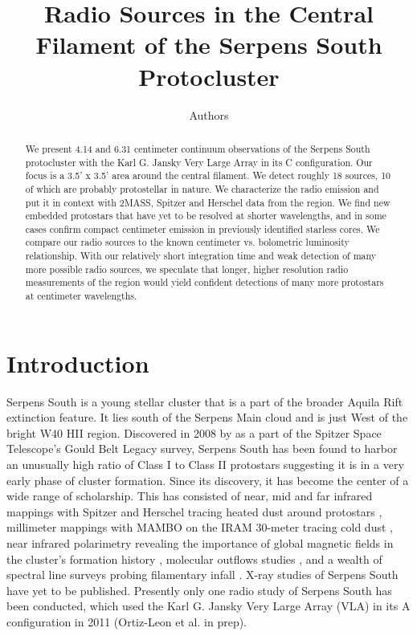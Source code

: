 \documentclass[apj]{emulateapj}
\begin{document}
\title{Radio Sources in the Central Filament of the Serpens South Protocluster}
\author{Authors}

\begin{abstract}

We present 4.14 and 6.31 centimeter continuum observations of the Serpens South protocluster with the Karl G. Jansky Very Large Array in its C configuration. Our focus is a 3.5' x 3.5' area around the central filament. We detect roughly 18 sources, 10 of which are probably protostellar in nature. We characterize the radio emission and put it in context with 2MASS, Spitzer and Herschel data from the region. We find new embedded protostars that have yet to be resolved at shorter wavelengths, and in some cases confirm compact centimeter emission in previously identified starless cores. We compare our radio sources to the known centimeter vs. bolometric luminosity relationship. With our relatively short integration time and weak detection of many more possible radio sources, we speculate that longer, higher resolution radio measurements of the region would yield confident detections of many more protostars at centimeter wavelengths. 

\end{abstract}

\maketitle
\newpage


\section{Introduction}
\label{sec:introduction}

	Serpens South is a young stellar cluster that is a part of the broader Aquila Rift extinction feature. It lies south of the Serpens Main cloud and is just West of the bright W40 HII region. Discovered in 2008 by \citet{Gutermuth08} as a part of the Spitzer Space Telescope's Gould Belt Legacy survey, Serpens South has been found to harbor an unusually high ratio of Class I to Class II protostars suggesting it is in a very early phase of cluster formation. Since its discovery, it has become the center of a wide range of scholarship. This has consisted of near, mid and far infrared mappings with Spitzer and Herschel tracing heated dust around protostars \citep{Gutermuth08, Bontemps10}, millimeter mappings with MAMBO on the IRAM 30-meter tracing cold dust \citep{Maury11}, near infrared polarimetry revealing the importance of global magnetic fields in the cluster's formation history \citep{Sugitani11}, molecular outflows studies \citep{Nakamura11, Teixeira12}, and a wealth of spectral line surveys probing filamentary infall \citep{Kirk13, Friesen13, Tanaka13, FernandezLopez14,Nakamura14a}. X-ray studies of Serpens South have yet to be published. Presently only one radio study of Serpens South has been conducted, which used the Karl G. Jansky Very Large Array (VLA) in its A configuration in 2011 (Ortiz-Leon et al. in prep). 
	
\end{document}
